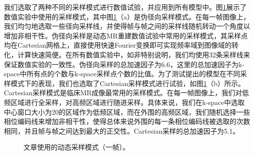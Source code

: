 我们选取了两种不同的采样模式进行数值试验，并应用到所有模型中。图\ref{fig:mask3}展示了数值实验中使用的采样模式，其中图\ref{fig:mask3}（a）是伪径向采样模式。在每一帧图像上，我们均匀地选取一些径向采样线，并使得帧与帧之间的采样线随机转动一个角度以增加非相干性。伪径向采样是动态MR重建数值试验中常用的采样模式，其采样点均在Cartesian网格上，直接使用快速Fourier变换即可实现频率域到图像域的转化，计算快速简便。在所有数值实验中，如非特别说明，我们均使用32条采样线来保证数值实验的一致性。伪径向采样的总加速因子为6.6，这里的总加速因子为k-space中所有点的个数与k-space采样点个数的比值。为了测试提出的模型在不同采样模式下的表现，我们也选取了Cartesian采样模式进行试验，如图\ref{fig:mask3}（b）所示。Cartesian采样模式是临床MR成像最常用的采样模式。在每一帧图像上，我们对低频区域进行全采样，对高频区域进行随进采样。具体来说，我们在k-space中选取中心窗口大小为20的区域作为低频区域，而在外围的高频区域，我们随机选择一些相位编码线来增加非相干性，使得总体来说外围的每一条相位编码线被选取的次数相同，并且帧与帧之间达到最大的正交性。Cartesian采样的总加速因子为5.1。
\begin{figure}[htbp]
\centering
{}
\centering
\caption{文章使用的动态采样模式（一帧）。}
\label{fig:mask3}
\end{figure}

